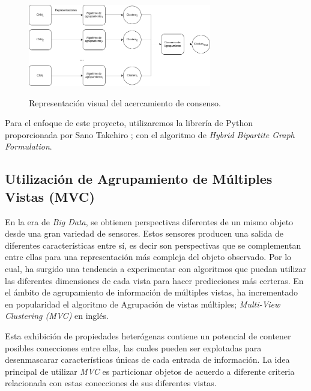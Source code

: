 \documentclass[letterpaper, 10 pt, conference]{ieeeconf}  %
\begin{document}
    \begin{figure}[ht]
        \centering
        \includegraphics[width=8cm]{./figs/mvec.png}
        \label{fig: MVEC}
        \caption{Representación visual del acercamiento de consenso.}
    \end{figure}

    Para el enfoque de este proyecto, utilizaremos la librería de Python proporcionada por Sano
    Takehiro \cite{Sano_ClusterEnsembles_2021}; con el algoritmo de \textit{Hybrid Bipartite Graph
    Formulation}. \cite{Fern2004}

    \subsection{Utilización de Agrupamiento de Múltiples Vistas (MVC)}
    En la era de \textit{Big Data}, se obtienen perspectivas diferentes de un mismo objeto desde
    una gran variedad de sensores. Estos sensores producen una salida de diferentes características
    entre sí, es decir son perspectivas que se complementan entre ellas para una representación
    más compleja del objeto observado. Por lo cual, ha surgido una tendencia a experimentar con
    algoritmos que puedan utilizar las diferentes dimensiones de cada vista para hacer predicciones
    más certeras.  En el ámbito de agrupamiento de información de múltiples vistas, ha incrementado
    en popularidad el algoritmo de Agrupación de vistas múltiples; \textit{Multi-View Clustering
    (MVC)} en inglés.

    Esta exhibición de propiedades heterógenas contiene un potencial de contener posibles
    conecciones entre ellas, las cuales pueden ser explotadas para desenmascarar características
    únicas de cada entrada de información. La idea principal de utilizar \textit{MVC} es
    particionar objetos de acuerdo a diferente criteria relacionada con estas conecciones de sus
    diferentes vistas. \cite{Yang2018}
\end{document}
